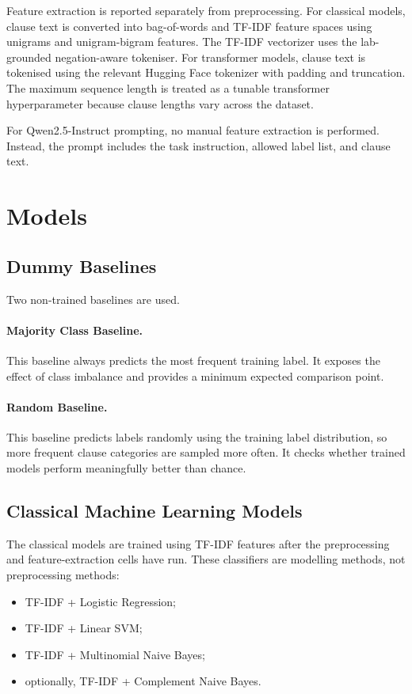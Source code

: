 \documentclass[11pt]{article}
\begin{document}
Feature extraction is reported separately from preprocessing. For classical models, clause text is converted into bag-of-words and TF-IDF feature spaces using unigrams and unigram-bigram features. The TF-IDF vectorizer uses the lab-grounded negation-aware tokeniser. For transformer models, clause text is tokenised using the relevant Hugging Face tokenizer with padding and truncation. The maximum sequence length is treated as a tunable transformer hyperparameter because clause lengths vary across the dataset.

For Qwen2.5-Instruct prompting, no manual feature extraction is performed. Instead, the prompt includes the task instruction, allowed label list, and clause text.

\section{Models}

\subsection{Dummy Baselines}

Two non-trained baselines are used.

\paragraph{Majority Class Baseline.}
This baseline always predicts the most frequent training label. It exposes the effect of class imbalance and provides a minimum expected comparison point.

\paragraph{Random Baseline.}
This baseline predicts labels randomly using the training label distribution, so more frequent clause categories are sampled more often. It checks whether trained models perform meaningfully better than chance.

\subsection{Classical Machine Learning Models}

The classical models are trained using TF-IDF features after the preprocessing and feature-extraction cells have run. These classifiers are modelling methods, not preprocessing methods:

\begin{itemize}[leftmargin=*]
    \item TF-IDF + Logistic Regression;
    \item TF-IDF + Linear SVM;
    \item TF-IDF + Multinomial Naive Bayes;
    \item optionally, TF-IDF + Complement Naive Bayes.
\end{itemize}
\end{document}
